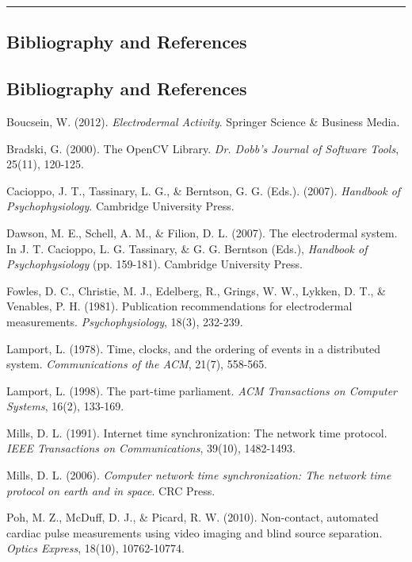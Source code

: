 \documentclass[12pt,a4paper]{report}
\begin{document}
\hrule

\subsection{Bibliography and References}

\subsection{Bibliography and References}

\begin{thebibliography}{99}

Boucsein, W. (2012). \textit{Electrodermal Activity}. Springer Science \& Business Media.

Bradski, G. (2000). The OpenCV Library. \textit{Dr. Dobb's Journal of Software Tools}, 25(11), 120-125.

Cacioppo, J. T., Tassinary, L. G., \& Berntson, G. G. (Eds.). (2007). \textit{Handbook of Psychophysiology}. Cambridge University Press.

Dawson, M. E., Schell, A. M., \& Filion, D. L. (2007). The electrodermal system. In J. T. Cacioppo, L. G. Tassinary, \& G. G. Berntson (Eds.), \textit{Handbook of Psychophysiology} (pp. 159-181). Cambridge University Press.

Fowles, D. C., Christie, M. J., Edelberg, R., Grings, W. W., Lykken, D. T., \& Venables, P. H. (1981). Publication recommendations for electrodermal measurements. \textit{Psychophysiology}, 18(3), 232-239.

Lamport, L. (1978). Time, clocks, and the ordering of events in a distributed system. \textit{Communications of the ACM}, 21(7), 558-565.

Lamport, L. (1998). The part-time parliament. \textit{ACM Transactions on Computer Systems}, 16(2), 133-169.

Mills, D. L. (1991). Internet time synchronization: The network time protocol. \textit{IEEE Transactions on Communications}, 39(10), 1482-1493.

Mills, D. L. (2006). \textit{Computer network time synchronization: The network time protocol on earth and in space}. CRC Press.

Poh, M. Z., McDuff, D. J., \& Picard, R. W. (2010). Non-contact, automated cardiac pulse measurements using video imaging and blind source separation. \textit{Optics Express}, 18(10), 10762-10774.


\end{thebibliography}
\end{document}
